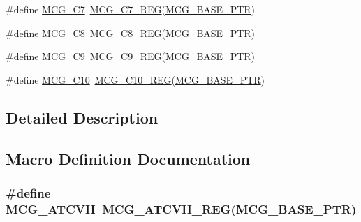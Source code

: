 \begin{DoxyCompactItemize}
\item 
\#define \hyperlink{group___m_c_g___register___accessor___macros_ga9fc6058dcffc6506763ff7235669038c}{M\+C\+G\+\_\+\+C7}~\hyperlink{group___m_c_g___register___accessor___macros_ga305ccd258608317dc3800156b312ff65}{M\+C\+G\+\_\+\+C7\+\_\+\+R\+EG}(\hyperlink{group___m_c_g___peripheral_gaceefc72e93a47a35f59a31c57dddf41b}{M\+C\+G\+\_\+\+B\+A\+S\+E\+\_\+\+P\+TR})
\item 
\#define \hyperlink{group___m_c_g___register___accessor___macros_ga4328cf0c21c1c85cc0d618f7762016b8}{M\+C\+G\+\_\+\+C8}~\hyperlink{group___m_c_g___register___accessor___macros_gabd2e261bd5f2bddbbed7e076eaf90dee}{M\+C\+G\+\_\+\+C8\+\_\+\+R\+EG}(\hyperlink{group___m_c_g___peripheral_gaceefc72e93a47a35f59a31c57dddf41b}{M\+C\+G\+\_\+\+B\+A\+S\+E\+\_\+\+P\+TR})
\item 
\#define \hyperlink{group___m_c_g___register___accessor___macros_ga40ae99ab2fbda74612a8f3f6bab361e0}{M\+C\+G\+\_\+\+C9}~\hyperlink{group___m_c_g___register___accessor___macros_ga39eb9908ab90f92f6fb8a38a3257734c}{M\+C\+G\+\_\+\+C9\+\_\+\+R\+EG}(\hyperlink{group___m_c_g___peripheral_gaceefc72e93a47a35f59a31c57dddf41b}{M\+C\+G\+\_\+\+B\+A\+S\+E\+\_\+\+P\+TR})
\item 
\#define \hyperlink{group___m_c_g___register___accessor___macros_gab582a1281f6376c0dd52e62c3e22653e}{M\+C\+G\+\_\+\+C10}~\hyperlink{group___m_c_g___register___accessor___macros_gac02ecb9de294f19f1290b9d6863cce3c}{M\+C\+G\+\_\+\+C10\+\_\+\+R\+EG}(\hyperlink{group___m_c_g___peripheral_gaceefc72e93a47a35f59a31c57dddf41b}{M\+C\+G\+\_\+\+B\+A\+S\+E\+\_\+\+P\+TR})
\end{DoxyCompactItemize}


\subsection{Detailed Description}


\subsection{Macro Definition Documentation}
\subsubsection[{\texorpdfstring{M\+C\+G\+\_\+\+A\+T\+C\+VH}{MCG_ATCVH}}]{\setlength{\rightskip}{0pt plus 5cm}\#define M\+C\+G\+\_\+\+A\+T\+C\+VH~{\bf M\+C\+G\+\_\+\+A\+T\+C\+V\+H\+\_\+\+R\+EG}({\bf M\+C\+G\+\_\+\+B\+A\+S\+E\+\_\+\+P\+TR})}\hypertarget{group___m_c_g___register___accessor___macros_ga1cb18ffdb73d4eaad4573563aec49be0}{}\label{group___m_c_g___register___accessor___macros_ga1cb18ffdb73d4eaad4573563aec49be0}


